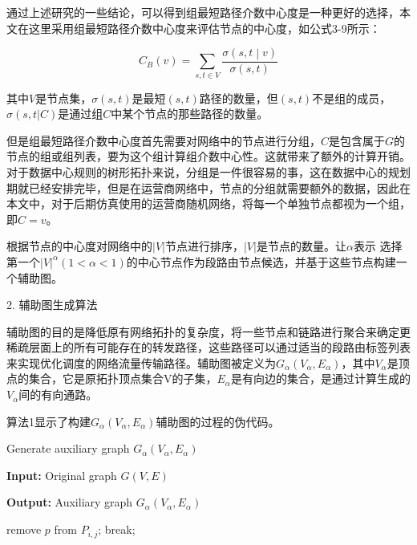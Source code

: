 通过上述研究的一些结论，可以得到组最短路径介数中心度是一种更好的选择，本文在这里采用组最短路径介数中心度来评估节点的中心度，如公式3-9所示：

\begin{equation} \label{node centrality}
    C_B\left(v\right)=\sum_{s,t\in V}\frac{\sigma\left(s,t\middle| v\right)}{\sigma(s,t)}
\end{equation}

其中$V$是节点集，$\sigma\left(s,t\right)$是最短$\left(s,t\right)$路径的数量，但$\left(s,t\right)$不是组的成员，$\sigma(s,t|C)$是通过组$C$中某个节点的那些路径的数量。

但是组最短路径介数中心度首先需要对网络中的节点进行分组，$C$是包含属于$G$的节点的组或组列表，要为这个组计算组介数中心性。这就带来了额外的计算开销。对于数据中心规则的树形拓扑来说，分组是一件很容易的事，这在数据中心的规划期就已经安排完毕，但是在运营商网络中，节点的分组就需要额外的数据，因此在本文中，对于后期仿真使用的运营商随机网络，将每一个单独节点都视为一个组，即$C=v$。

根据节点的中心度对网络中的$|V|$节点进行排序，$|V|$是节点的数量。让$\alpha$表示 选择第一个${|V|}^\alpha(1<\alpha<1)$的中心节点作为段路由节点候选，并基于这些节点构建一个辅助图。

2. 辅助图生成算法

辅助图的目的是降低原有网络拓扑的复杂度，将一些节点和链路进行聚合来确定更稀疏层面上的所有可能存在的转发路径，这些路径可以通过适当的段路由标签列表来实现优化调度的网络流量传输路径。辅助图被定义为$G_\alpha\left(V_\alpha,E_\alpha\right)$，其中$V_\alpha$是顶点的集合，它是原拓扑顶点集合V的子集，$E_\alpha$是有向边的集合，是通过计算生成的$V_\alpha$间的有向通路。

算法1显示了构建$G_\alpha\left(V_\alpha,E_\alpha\right)$辅助图的过程的伪代码。

\begin{algorithm}[h]
\setlength{\abovedisplayskip}{8pt}
\setlength{\belowdisplayskip}{2pt}
\caption{Generate auxiliary graph  $G_\alpha(V_\alpha,E_\alpha)$}  
\hspace*{0.02in} {\bf Input:} 
    Original graph $G(V,E)$
    
\hspace*{0.02in} {\bf Output:}
Auxiliary graph  $G_\alpha(V_\alpha,E_\alpha)$
 
\begin{algorithmic}[1]
\STATE remove $p$ from $P_{i,j}$;
\STATE break;
\ENDIF
\ENDFOR
\ENDFOR
{}
\ELSE
{}
\ENDIF
\ENDFOR
\end{algorithmic}

\end{algorithm}


